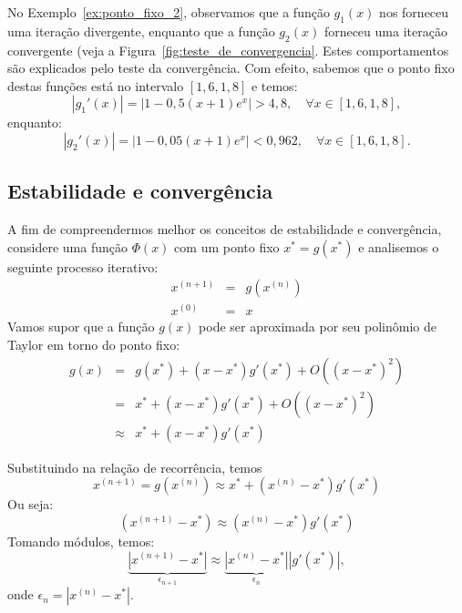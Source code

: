 \begin{ex}
\begin{ex}\label{ex:ponto_fixo_4}
  No Exemplo~\ref{ex:ponto_fixo_2}, observamos que a função $g_1(x)$ nos forneceu uma iteração divergente, enquanto que a função $g_2(x)$ forneceu uma iteração convergente (veja a Figura~\ref{fig:teste_de_convergencia}. Estes comportamentos são explicados pelo teste da convergência. Com efeito, sabemos que o ponto fixo destas funções está no intervalo $[1,6, 1,8]$ e temos:
  \begin{equation}
    |g_1'(x)| = |1 - 0,5(x+1)e^x| > 4,8,\quad\forall x\in [1,6, 1,8],
  \end{equation}
enquanto:
\begin{equation}
  |g_2'(x)| = |1 - 0,05(x+1)e^x| < 0,962,\quad\forall x\in [1,6, 1,8].
\end{equation}
\end{ex}

\subsection{Estabilidade e convergência}

A fim de compreendermos melhor os conceitos de estabilidade e convergência, considere uma função $\Phi(x)$ com um ponto fixo $x^*=g(x^*)$ e analisemos o seguinte processo iterativo:
\begin{eqnarray}
x^{(n+1)}&=&g\left(x^{(n)}\right)\\
x^{(0)}&=&x
\end{eqnarray}
Vamos supor que a função $g(x)$ pode ser aproximada por seu polinômio de Taylor em torno do ponto fixo:
\begin{eqnarray}
g(x)&=&g(x^*)+(x-x^*) g'(x^*)+O\left((x-x^*)^2\right)\\
&=&x^*+(x-x^*) g'(x^*)+O\left((x-x^*)^2\right)\\
&\approx& x^*+(x-x^*) g'(x^*)
\end{eqnarray}

Substituindo na relação de recorrência, temos
\begin{equation}
x^{(n+1)}=g\left(x^{(n)}\right)\approx x^*+(x^{(n)}-x^*) g'(x^*)
\end{equation}
Ou seja:
\begin{equation}
\left(x^{(n+1)}-x^*\right)\approx {(x^{(n)}-x^*)} g'(x^*)
\end{equation}
Tomando módulos, temos:
\begin{equation}
\underbrace{\left|x^{(n+1)}-x^*\right|}_{\epsilon_{n+1}}\approx \underbrace{\left|x^{(n)}-x^*\right|}_{\epsilon_n} \left|g'(x^*)\right|,
\end{equation}
onde $\epsilon_n=\left|x^{(n)}-x^*\right|$.


\end{ex}
